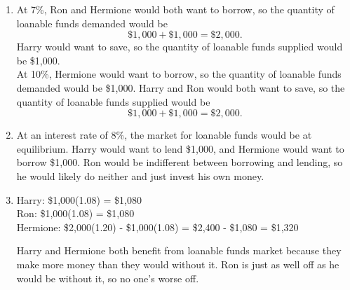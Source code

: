 \documentclass{article}
\begin{document}
\begin{enumerate}
\begin{enumerate}
	\item At 7\%, Ron and Hermione would both want to borrow, so the quantity of loanable funds demanded would be \[ \$1,000 + \$1,000 = \$2,000. \] Harry would want to save, so the quantity of loanable funds supplied would be \$1,000. \\
	At 10\%, Hermione would want to borrow, so the quantity of loanable funds demanded would be \$1,000. Harry and Ron would both want to save, so the quantity of loanable funds supplied would be \[\$1,000 + \$1,000 = \$2,000. \]
	
	\item At an interest rate of 8\%, the market for loanable funds would be at equilibrium. Harry would want to lend \$1,000, and Hermione would want to borrow \$1,000. Ron would be indifferent between borrowing and lending, so he would likely do neither and just invest his own money. 
	
	\item Harry: \$1,000(1.08) = \$1,080 \\
		Ron: \$1,000(1.08) = \$1,080 \\
		Hermione: \$2,000(1.20) - \$1,000(1.08) = \$2,400 - \$1,080 = \$1,320
		
		Harry and Hermione both benefit from loanable funds market because they make more money than they would without it. Ron is just as well off as he would be  without it, so no one's worse off.
	
	\end{enumerate}

\end{enumerate}
\end{document}
